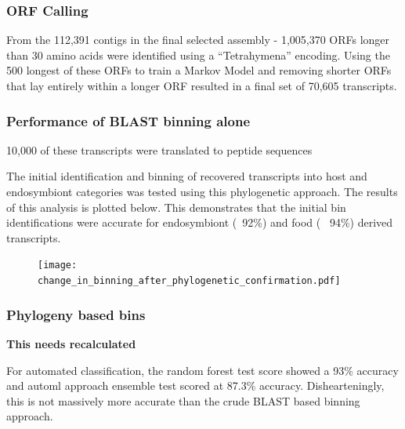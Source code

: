 \subsubsection{ORF Calling}

From the 112,391 contigs in the final selected assembly - 1,005,370 ORFs
longer than 30 amino acids were identified using a ``Tetrahymena'' encoding.
Using the 500 longest of these ORFs to train a Markov Model and removing
shorter ORFs that lay entirely within a longer ORF resulted in a final set
of 70,605 transcripts.

\subsubsection{Performance of BLAST binning alone}

10,000 of these transcripts were translated to peptide sequences 

The initial identification and binning of recovered transcripts into host and endosymbiont categories was 
tested using this phylogenetic approach. The results of this analysis is plotted 
below. This demonstrates that the initial bin identifications were accurate for
endosymbiont (~92\%) and food ( ~94\%) derived transcripts. 


\begin{figure}
    \texttt{[image: change\_in\_binning\_after\_phylogenetic\_confirmation.pdf]}
\end{figure}


\subsubsection{Phylogeny based bins}

\textbf{This needs recalculated}


For automated classification, the random forest test score showed a 93\% accuracy and automl approach ensemble test scored at 87.3\% accuracy.
Dishearteningly, this is not massively more accurate than the crude BLAST based binning approach.
 


